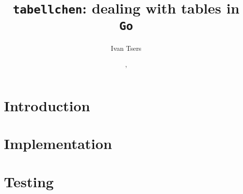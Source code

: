 \documentclass[a4paper]{article}
\begin{document}
\pagestyle{noweb}

\title{\texttt{tabellchen}: dealing with tables in \texttt{Go}}
\author{Ivan Tsers}
\date{, }
\maketitle

\tableofcontents

\section{Introduction}

\section{Implementation}

\section{Testing}

\end{document}
